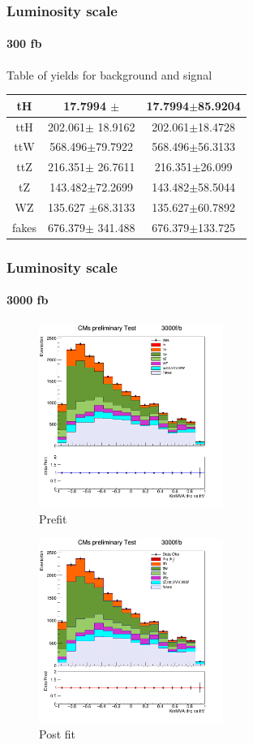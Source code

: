 \documentclass[11pt]{beamer}
\begin{document}
\begin{frame}
\frametitle{Luminosity scale}
\framesubtitle{300 fb}
Table of yields for background and signal
\begin{table}
	\begin{tabular}{|c|c|c|}
			\hline
tH & 17.7994 $\pm$ & 17.7994$\pm$85.9204\\
\hline
ttH  & 202.061$\pm$ 18.9162 & 202.061$\pm$18.4728\\
\hline
ttW  & 568.496$\pm$79.7922 & 568.496$\pm$56.3133\\
\hline
ttZ  & 216.351$\pm$ 26.7611 & 216.351$\pm$26.099\\
\hline
tZ & 143.482$\pm$72.2699 & 143.482$\pm$58.5044\\
\hline
WZ & 135.627 $\pm$68.3133& 135.627$\pm$60.7892\\
\hline
fakes  & 676.379$\pm$ 341.488 & 676.379$\pm$133.725\\
	\hline
	\end{tabular}
\end{table}
\end{frame}






\begin{frame}
\frametitle{Luminosity scale}
\framesubtitle{3000 fb}
\begin{multicols}{2}
	\begin{center}
		\begin{figure}
			\includegraphics[width=6cm,height=6cm]{figures/3000fb/kin-3000.png}
				\caption*{Prefit }
		\end{figure}
	\end{center}
	\columnbreak
	\begin{center}
		\begin{figure}
			\includegraphics[width=6cm,height=6cm]{figures/3000fb/simple.png}
				\caption*{Post fit }
		\end{figure}
	\end{center}
\end{multicols}
\end{frame}
\end{document}
